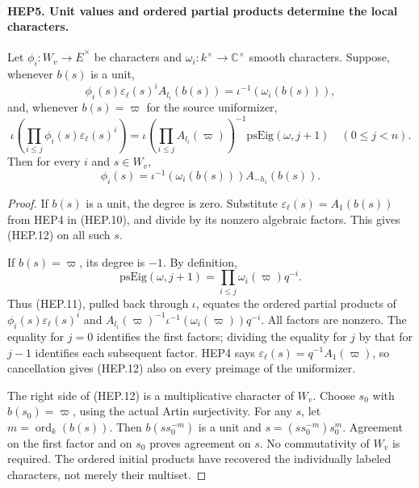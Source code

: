 \documentclass[11pt,a4paper]{article}
\numberwithin{equation}{section}
\theoremstyle{remark}\newtheorem{remark}[theorem]{Remark}
\begin{document}
\paragraph{HEP5. Unit values and ordered partial products determine the local characters.}
\label{claim:HEP5}
Let $\phi_i:W_v\to\overline E^\times$ be characters and
$\omega_i:k^\times\to\mathbb C^\times$ smooth characters.
Suppose, whenever $b(s)$ is a unit,
\[
 \phi_i(s)\varepsilon_\ell(s)^i A_{l_i}(b(s))
                             =\iota^{-1}(\omega_i(b(s))),
 \tag{HEP.10}
\]
and, whenever $b(s)=\varpi$ for the source uniformizer,
\[
 \iota\left(\prod_{i\leq j}\phi_i(s)\varepsilon_\ell(s)^i\right)
  =\iota\left(\prod_{i\leq j}A_{l_i}(\varpi)\right)^{-1}
                                  \mathrm{psEig}(\omega,j+1)
                      \quad(0\leq j<n).
 \tag{HEP.11}
\]
Then for every $i$ and $s\in W_v$,
\[
       \phi_i(s)=\iota^{-1}(\omega_i(b(s)))A_{-h_i}(b(s)).
 \tag{HEP.12}
\]
\begin{proof}
If $b(s)$ is a unit, the degree is zero.  Substitute
$\varepsilon_\ell(s)=A_1(b(s))$ from HEP4 in (HEP.10),
and divide by its nonzero algebraic factors.  This gives
(HEP.12) on all such $s$.

If $b(s)=\varpi$, its degree is $-1$.  By definition,
\[
       \mathrm{psEig}(\omega,j+1)
                  =\prod_{i\leq j}\omega_i(\varpi)q^{-i}.
 \tag{HEP.13}
\]
Thus (HEP.11), pulled back through $\iota$, equates the ordered
partial products of $\phi_i(s)\varepsilon_\ell(s)^i$ and
$A_{l_i}(\varpi)^{-1}\iota^{-1}(\omega_i(\varpi))q^{-i}$.
All factors are nonzero.  The equality for $j=0$ identifies the
first factors; dividing the equality for $j$ by that for $j-1$
identifies each subsequent factor.  HEP4 says
$\varepsilon_\ell(s)=q^{-1}A_1(\varpi)$, so cancellation gives
(HEP.12) also on every preimage of the uniformizer.

The right side of (HEP.12) is a multiplicative character of $W_v$.
Choose $s_0$ with $b(s_0)=\varpi$, using the actual Artin
surjectivity.  For any $s$, let $m=\operatorname{ord}_k(b(s))$.
Then $b(ss_0^{-m})$ is a unit and
$s=(ss_0^{-m})s_0^m$.  Agreement on the first factor and on $s_0$
proves agreement on $s$.  No commutativity of $W_v$ is required.
The ordered initial products have recovered the individually
labeled characters, not merely their multiset.
\end{proof}

\end{document}
